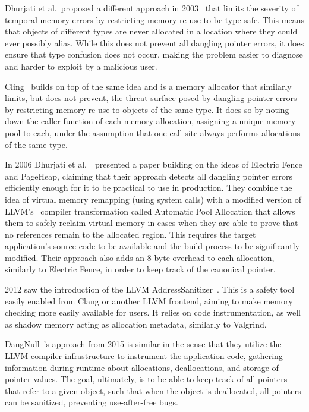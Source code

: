 Dhurjati et al.\ proposed a different approach in 2003~\cite{dhurjati2003memory} that limits the severity of temporal memory errors by restricting memory re-use to be type-safe. This means that objects of different types are never allocated in a location where they could ever possibly alias. While this does not prevent all dangling pointer errors, it does ensure that type confusion does not occur, making the problem easier to diagnose and harder to exploit by a malicious user.

Cling~\cite{akritidis2010cling} builds on top of the same idea and is a memory allocator that similarly limits, but does not prevent, the threat surface posed by dangling pointer errors by restricting memory re-use to objects of the same type. It does so by noting down the caller function of each memory allocation, assigning a unique memory pool to each, under the assumption that one call site always performs allocations of the same type.

In 2006 Dhurjati et al.~\cite{dhurjati2006efficiently}\ presented a paper building on the ideas of Electric Fence and PageHeap, claiming that their approach detects all dangling pointer errors efficiently enough for it to be practical to use in production. They combine the idea of virtual memory remapping (using system calls) with a modified version of LLVM's~\cite{llvm-web} compiler transformation called Automatic Pool Allocation that allows them to safely reclaim virtual memory in cases when they are able to prove that no references remain to the allocated region. This requires the target application's source code to be available and the build process to be significantly modified. Their approach also adds an 8 byte overhead to each allocation, similarly to Electric Fence, in order to keep track of the canonical pointer.

2012 saw the introduction of the LLVM AddressSanitizer~\cite{llvm-address-sanitizer2012}. This is a safety tool easily enabled from Clang or another LLVM frontend, aiming to make memory checking more easily available for users. It relies on code instrumentation, as well as shadow memory acting as allocation metadata, similarly to Valgrind.

DangNull~\cite{dangnull2015}'s approach from 2015 is similar in the sense that they utilize the LLVM compiler infrastructure to instrument the application code, gathering information during runtime about allocations, deallocations, and storage of pointer values. The goal, ultimately, is to be able to keep track of all pointers that refer to a given object, such that when the object is deallocated, all pointers can be sanitized, preventing use-after-free bugs. 

